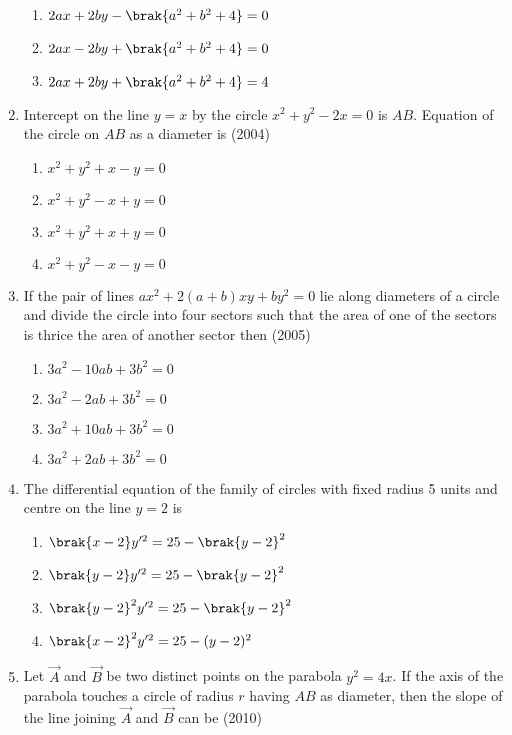 \begin{enumerate}[label=\thesubsection.\arabic*.,ref=\thesubsection.\theenumi]
\begin{multicols}{2}
\begin{enumerate}
\item $2ax+2by-\brak{a^2+b^2+4}=0$
\item $2ax-2by+\brak{a^2+b^2+4}=0$
\item $2ax+2by+\brak{a^2+b^2+4}=4$
\end{enumerate}
\end{multicols}
\item Intercept on the line $y=x$ by the circle $x^2+y^2-2x=0$ is $AB$. Equation of the circle on $AB$ as a diameter is 
\hfill{(2004)}
\begin{multicols}{2}
\begin{enumerate}
\item $x^2+y^2+x-y=0$
\item $x^2+y^2-x+y=0$
\item $x^2+y^2+x+y=0$
\item $x^2+y^2-x-y=0$
\end{enumerate}
\end{multicols}
\item If the pair of lines $ax^2+2(a+b)xy+by^2=0$ lie along diameters of a circle and divide the circle into four sectors such that the area of one of the sectors is thrice the area of another sector then
\hfill{(2005)}
\begin{multicols}{2}
\begin{enumerate}
\item $3a^2-10ab+3b^2=0$
\item $3a^2-2ab+3b^2=0$
\item $3a^2+10ab+3b^2=0$
\item $3a^2+2ab+3b^2=0$
\end{enumerate}
\end{multicols}
\item The differential equation of the family of circles with fixed radius 5 units and centre on the line $y=2$ is
\begin{multicols}{2}
\begin{enumerate}
\item $\brak{x-2}y^{\prime 2}=25-\brak{y-2}^2$
\item $\brak{y-2}y^{\prime 2}=25-\brak{y-2}^2$
\item $\brak{y-2}^2y^{\prime 2}=25-\brak{y-2}^2$
\item $\brak{x-2}^2y^{\prime 2}=25-(y-2)^2$
\end{enumerate}
\end{multicols}
	\item Let $\vec{A}$ and $\vec{B}$ be two distinct points on the parabola $y^2=4x$. If
      	      the axis of the parabola touches a circle of radius $r$ having
		$AB$ as diameter, then the slope of the line joining $\vec{A}$ and $\vec{B}$
	     can be 
		\hfill(2010)
		

\end{enumerate}
